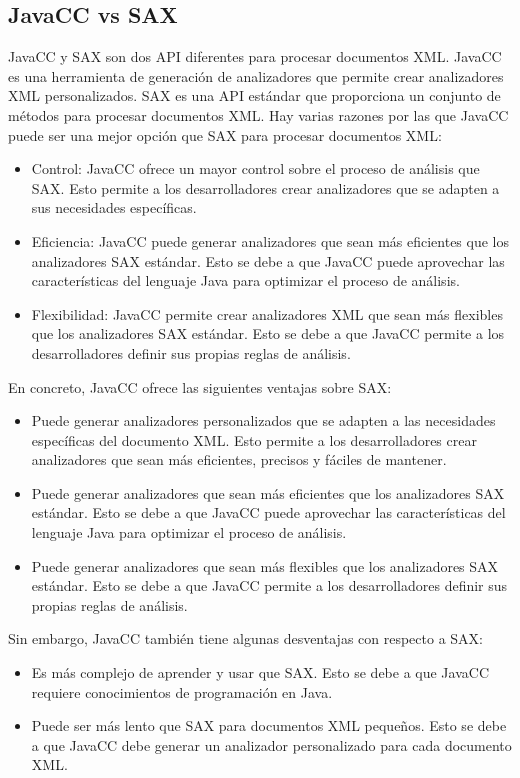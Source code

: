 \subsection{JavaCC vs SAX}

JavaCC y SAX son dos API diferentes para procesar documentos XML. JavaCC es una herramienta de generación de analizadores que permite crear analizadores XML personalizados. SAX es una API estándar que proporciona un conjunto de métodos para procesar documentos XML.
Hay varias razones por las que JavaCC puede ser una mejor opción que SAX para procesar documentos XML:
\begin{itemize}
    \item Control: JavaCC ofrece un mayor control sobre el proceso de análisis que SAX. Esto permite a los desarrolladores crear analizadores que se adapten a sus necesidades específicas.
	\item Eficiencia: JavaCC puede generar analizadores que sean más eficientes que los analizadores SAX estándar. Esto se debe a que JavaCC puede aprovechar las características del lenguaje Java para optimizar el proceso de análisis.
	 \item Flexibilidad: JavaCC permite crear analizadores XML que sean más flexibles que los analizadores SAX estándar. Esto se debe a que JavaCC permite a los desarrolladores definir sus propias reglas de análisis.
\end{itemize}
En concreto, JavaCC ofrece las siguientes ventajas sobre SAX:
\begin{itemize}
    \item Puede generar analizadores personalizados que se adapten a las necesidades específicas del documento XML. Esto permite a los desarrolladores crear analizadores que sean más eficientes, precisos y fáciles de mantener.
    \item Puede generar analizadores que sean más eficientes que los analizadores SAX estándar. Esto se debe a que JavaCC puede aprovechar las características del lenguaje Java para optimizar el proceso de análisis.
    \item Puede generar analizadores que sean más flexibles que los analizadores SAX estándar. Esto se debe a que JavaCC permite a los desarrolladores definir sus propias reglas de análisis.
\end{itemize}

Sin embargo, JavaCC también tiene algunas desventajas con respecto a SAX:
\begin{itemize}
    \item Es más complejo de aprender y usar que SAX. Esto se debe a que JavaCC requiere conocimientos de programación en Java.
    \item Puede ser más lento que SAX para documentos XML pequeños. Esto se debe a que JavaCC debe generar un analizador personalizado para cada documento XML.
\end{itemize}

